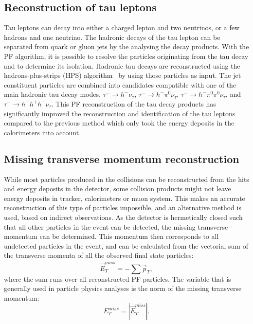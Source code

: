 \subsection{Reconstruction of tau leptons}
\label{sec:tauID}

Tau leptons can decay into either a charged lepton and two neutrinos, or a few hadrons and one neutrino. The hadronic decays of the tau lepton can be separated from quark or gluon jets by the analysing the decay products. With the \ac{PF} algorithm, it is possible to resolve the particles originating from the tau decay and to determine its isolation. Hadronic tau decays are reconstructed using the hadrons-plus-strips (HPS) algorithm~\cite{Khachatryan:2015dfa} by using those particles as input. The jet constituent particles are combined into candidates compatible with one of the main hadronic tau decay modes, $\tau^- \rightarrow h^- \nu_{\tau}$, $\tau^- \rightarrow h^- \pi^0 \nu_{\tau}$, $\tau^- \rightarrow h^- \pi^0 \pi^0 \nu_{\tau}$, and $\tau^- \rightarrow h^- h^+ h^- \nu_{\tau}$. This \ac{PF} reconstruction of the tau decay products has significantly improved the reconstruction and identification of the tau leptons compared to the previous method which only took the energy deposits in the calorimeters into account.

\subsection{Missing transverse momentum reconstruction}
\label{sec:MET}

While most particles produced in the collisions can be reconstructed from the hits and energy deposits in the detector, some collision products might not leave energy deposits in tracker, calorimeters or muon system. This makes an accurate reconstruction of this type of particles impossible, and an alternative method is used, based on indirect observations. As the detector is hermetically closed such that all other particles in the event can be detected, the missing transverse momentum can be determined. This momentum then corresponds to all undetected particles in the event, and can be calculated from the vectorial sum of the transverse momenta of all the observed final state particles:
\begin{equation}
 \vec{E}_T^{miss} = - \sum \vec{p}_T,
\end{equation}
where the sum runs over all reconstructed \ac{PF} particles. The variable that is generally used in particle physics analyses is the norm of the missing transverse momentum:
\begin{equation}
 E_T^{miss} = |\vec{E}_T^{miss}|.
\end{equation}

